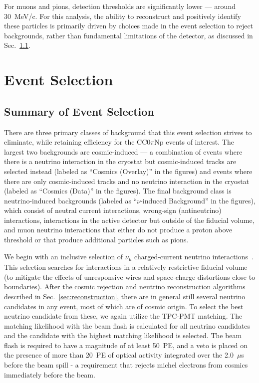 \documentclass[%
twocolumn,
 amsmath,amssymb,
 aps,
prd,
superscriptaddress,showpacs]{revtex4-2}
\begin{document}
For muons and pions, detection thresholds are significantly lower --- around 30~MeV/c.  For this analysis, the ability to reconstruct and positively identify these particles is primarily driven by choices made in the event selection to reject backgrounds, rather than fundamental limitations of the detector, as discussed in Sec.~\ref{sec:event_sel}.

\section{Event Selection} 
\subsection{Summary of Event Selection}
\label{sec:event_sel}

There are three primary classes of background that this event selection strives to eliminate, while retaining efficiency for the  CC0$\pi$Np events of interest.
The largest two backgrounds are cosmic-induced --- a combination of events where there is a neutrino interaction in the cryostat but cosmic-induced tracks are selected instead (labeled as ``Cosmics (Overlay)'' in the figures) and events where there are only cosmic-induced tracks and no neutrino interaction in the cryostat (labeled as ``Cosmics (Data)'' in the figures).
The final background class is neutrino-induced backgrounds (labeled as ``$\nu$-induced Background'' in the figures), which consist of neutral current interactions, wrong-sign (antineutrino) interactions, interactions in the active detector but outside of the fiducial volume, and muon neutrino interactions that either do not produce a proton above threshold or that produce additional particles such as pions.

We begin with an inclusive selection of $\nu_{\mu}$ charged-current neutrino interactions~\cite{Adams:2019iqcINCL}.
This selection searches for interactions in a relatively restrictive fiducial volume (to mitigate the effects of unresponsive wires and space-charge distortions close to boundaries).
After the cosmic rejection and neutrino reconstruction algorithms described in Sec.~\ref{sec:reconstruction}, there are in general still several neutrino candidates in any event, most of which are of cosmic origin.
To select the best neutrino candidate from these, we again utilize the TPC-PMT matching.
The matching likelihood with the beam flash is calculated for all neutrino candidates and the candidate with the highest matching likelihood is selected.
The beam flash is required to have a magnitude of at least 50~PE, and a veto is placed on the presence of more than 20~PE of optical activity integrated over the 2.0~$\mu$s before the beam spill - a requirement that rejects michel electrons from cosmics immediately before the beam.
\end{document}
